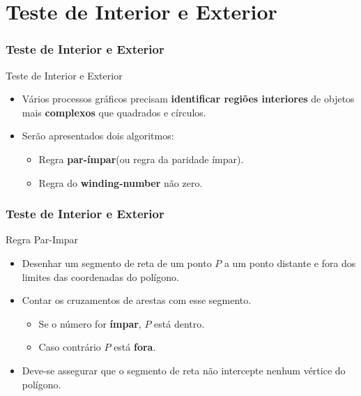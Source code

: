 \documentclass{beamer}
\begin{document}
\section{Teste de Interior e Exterior}
\begin{frame}
\frametitle{Teste de Interior e Exterior}

		\begin{block}{Teste de Interior e Exterior}
		\begin{itemize}
			\item Vários processos gráficos precisam \textbf{identificar regiões interiores} de objetos mais \textbf{complexos} que quadrados e círculos.
			\item Serão apresentados dois algoritmos:
			\begin{itemize}
				\item Regra \textbf{par-ímpar}(ou regra da paridade ímpar).
				\item Regra do \textbf{winding-number} não zero.
			\end{itemize}
		\end{itemize}
		\end{block}
	
\end{frame}


\begin{frame}
\frametitle{Teste de Interior e Exterior}

		\begin{block}{Regra Par-Impar}
		\begin{itemize}
			\item Desenhar um segmento de reta de um ponto $P$ a um ponto distante e fora dos limites das coordenadas do polígono.
			\item Contar os cruzamentos de arestas com esse segmento.
				\begin{itemize}
					\item Se o número for \textbf{ímpar}, $P$ está dentro.
					\item Caso contrário $P$ está \textbf{fora}.
				\end{itemize}
				\item Deve-se assegurar que o segmento de reta não intercepte nenhum vértice do polígono.
		\end{itemize}
		\end{block}
	
\end{frame}
\end{document}
